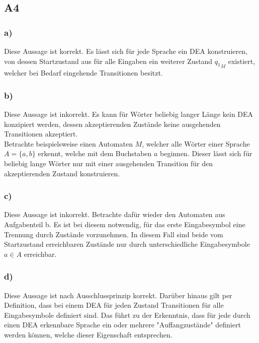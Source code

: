 \documentclass[12pt, a4paper]{article}
\begin{document}
\subsection*{A4}
\subsubsection*{a)}
Diese Aussage ist korrekt. Es lässt sich für jede Sprache ein DEA konstruieren, von 
dessen Startzustand aus für alle Eingaben ein weiterer Zustand \({q_1}_M\) existiert, 
welcher bei Bedarf eingehende Transitionen besitzt. 

\subsubsection*{b)}
Diese Aussage ist inkorrekt. Es kann für Wörter beliebig langer Länge kein DEA konzipiert 
werden, dessen akzeptierenden Zustände keine ausgehenden Transitionen akzeptiert. \\
Betrachte beispielsweise einen Automaten \(M\), welcher alle Wörter einer Sprache \(A=\{a,b\}\) 
erkennt, welche mit dem Buchstaben \(a\) beginnen. Dieser lässt sich für beliebig lange Wörter 
nur mit einer ausgehenden Transition für den akzeptierenden Zustand konstruieren.
\begin{center}
\end{center}

\subsubsection*{c)}
Diese Aussage ist inkorrekt. Betrachte dafür wieder den Automaten aus Aufgabenteil b. 
Es ist bei diesem notwendig, für das erste Eingabesymbol eine Trennung durch Zustände 
vorzunehmen. In diesem Fall sind beide vom Startzustand erreichbaren Zustände nur durch 
unterschiedliche Eingabesymbole \(a \in A\) erreichbar. 

\subsubsection*{d)}
Diese Aussage ist nach Ausschlussprinzip korrekt. Darüber hinaus gilt per Definition, dass 
bei einem DEA für jeden Zustand Transitionen für alle Eingabesymbole definiert sind. Das führt 
zu der Erkenntnis, dass für jede durch einen DEA erkennbare Sprache ein oder mehrere 
"Auffangzustände" definiert werden können, welche dieser Eigenschaft entsprechen. 
\end{document}
